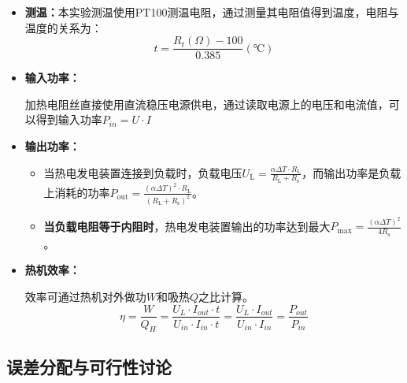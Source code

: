 \documentclass[dvipsnames, svgnames,a4paper,11pt]{article}
\begin{document}
        \begin{itemize}
            \item \textbf{测温：}本实验测温使用PT100测温电阻，通过测量其电阻值得到温度，电阻与温度的关系为：
                \[
                    t = \frac{R_t(\Omega) - 100}{0.385} (℃)
                \]



            \item \textbf{输入功率：}
            
			    加热电阻丝直接使用直流稳压电源供电，通过读取电源上的电压和电流值，可以得到输入功率$P_{in} = U \cdot I$
			




            \item \textbf{输出功率：}
            
                \begin{itemize}
                    \item 当热电发电装置连接到负载时，负载电压$U_{\text{L}} = \frac{\alpha \Delta T \cdot R_{\text{L}}}{R_{\text{L}} + R_{\text{s}}}$，而输出功率是负载上消耗的功率$P_{\text{out}} = \frac{(\alpha \Delta T)^2 \cdot R_{\text{L}}}{(R_{\text{L}} + R_{\text{s}})^2}$。
                    
                    \item \textbf{当负载电阻等于内阻时}，热电发电装置输出的功率达到最大$P_{\text{max}} = \frac{(\alpha \Delta T)^2}{4 R_{\text{s}}}$。	
                    
                \end{itemize}		








            \item \textbf{热机效率：}
            
                效率可通过热机对外做功$W$和吸热$Q$之比计算。
                \[
                    \eta = \frac{W}{Q_H} = \frac{U_L \cdot I_{out} \cdot t}{U_{in} \cdot I_{in} \cdot t} = \frac{U_L \cdot I_{out}}{U_{in} \cdot I_{in} } = \frac{P_{out}}{P_{in}}
                \]
            
        \end{itemize}



    \subsection{误差分配与可行性讨论}
\end{document}
